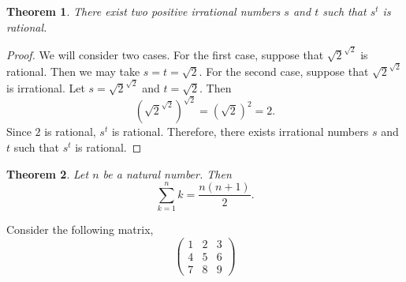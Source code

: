 \documentclass{article}  %
\newtheorem*{thm}{Theorem}
\begin{document}
\begin{thm}
There exist two positive irrational numbers $s$ and $t$ such that $s^t$ is rational.
\end{thm}
\begin{proof}
We will consider two cases.  For the first case, suppose that $\sqrt{2}^{\sqrt{2}}$ is rational.  Then we may take $s= t = \sqrt{2}$.  For the second case, suppose that $\sqrt{2}^{\sqrt{2}}$ is irrational.  Let $s= \sqrt{2}^{\sqrt{2}}$ and $t=\sqrt{2}$.  Then 
$$\left(\sqrt{2}^{\sqrt{2}}\right)^{\sqrt{2}} = \left(\sqrt{2}\right)^2 = 2.$$
Since $2$ is rational, $s^t$ is rational.  Therefore, there exists irrational numbers $s$ and $t$ such that $s^t$ is rational.
\end{proof}

\begin{thm}
Let $n$ be a natural number.  Then $$\sum_{k=1}^n k = \frac{n(n+1)}{2}.$$
\end{thm}

Consider the following matrix,
$$\left( \begin{array}{ccc}
1 &2 &3\\
4 &5 &6\\
7 &8 &9
\end{array}\right)$$
\end{document}
